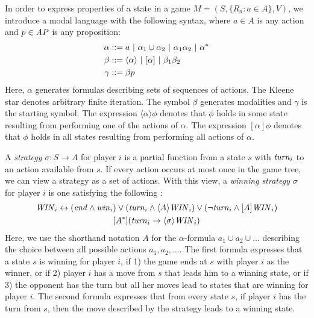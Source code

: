 In order to express properties of a state in a game $ M = (S, \{ R_{a} : a \in A \}, V) $, we introduce a modal language with the following syntax, where $ a \in A $ is any action and $ p \in \mathit{AP} $ is any proposition:
\begin{align*}
\alpha &::= a \ | \  \alpha_{1} \cup \alpha_{2} \ | \  \alpha_{1} \alpha_{2} \ | \  \alpha^{\ast} \\
\beta &::= \langle \alpha \rangle \ | \  [\alpha] \ | \  \beta_{1} \beta_{2} \\
\gamma &::= \beta p
\end{align*}
Here, $ \alpha $ generates formulas describing sets of sequences of actions. The Kleene star denotes arbitrary finite iteration. The symbol $ \beta $ generates modalities and $ \gamma $ is the starting symbol. The expression $ \langle \alpha \rangle \phi $ denotes that $ \phi $ holds in some state resulting from performing one of the actions of $ \alpha $. The expression $ [\alpha] \phi $ denotes that $ \phi $ holds in all states resulting from performing all actions of $ \alpha $.

A \emph{strategy} $ \sigma : S \rightarrow A $ for player $ i $ is a partial function from a state $ s $ with $ \mathit{turn}_{i} $ to an action available from $ s $. If every action occurs at most once in the game tree, we can view a strategy as a set of actions. With this view, a \emph{winning strategy} $ \sigma $ for player $ i $ is one satisfying the following \cite{benthem2001a}:
\begin{gather*}
\mathit{WIN}_{i} \leftrightarrow (\mathit{end} \wedge \mathit{win}_{i}) \vee (\mathit{turn}_{i} \wedge \langle A \rangle \mathit{WIN}_{i}) \vee (\neg \mathit{turn}_{i} \wedge [A] \mathit{WIN}_{i}) \\
[A^{\ast}](\mathit{turn}_{i} \rightarrow \langle \sigma \rangle \mathit{WIN}_{i})
\end{gather*}
Here, we use the shorthand notation $ A $ for the $ \alpha $-formula $ a_{1} \cup a_{2} \cup \dots $ describing the choice between all possible actions $ a_{1}, a_{2}, \dots $. The first formula expresses that a state $ s $ is winning for player $ i $, if 1) the game ends at $ s $ with player $ i $ as the winner, or if 2) player $ i $ has a move from $ s $ that leads him to a winning state, or if 3) the opponent has the turn but all her moves lead to states that are winning for player $ i $. The second formula expresses that from every state $ s $, if player $ i $ has the turn from $ s $, then the move described by the strategy leads to a winning state.


